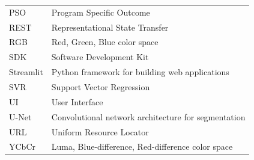 \begin{table}[h]
\begin{tabular}{ll}
PSO & Program Specific Outcome \\
REST & Representational State Transfer \\
RGB & Red, Green, Blue color space \\
SDK & Software Development Kit \\
Streamlit & Python framework for building web applications \\
SVR & Support Vector Regression \\
UI & User Interface \\
U-Net & Convolutional network architecture for segmentation \\
URL & Uniform Resource Locator \\
YCbCr & Luma, Blue-difference, Red-difference color space \\
\end{tabular}
\end{table}

\newpage
